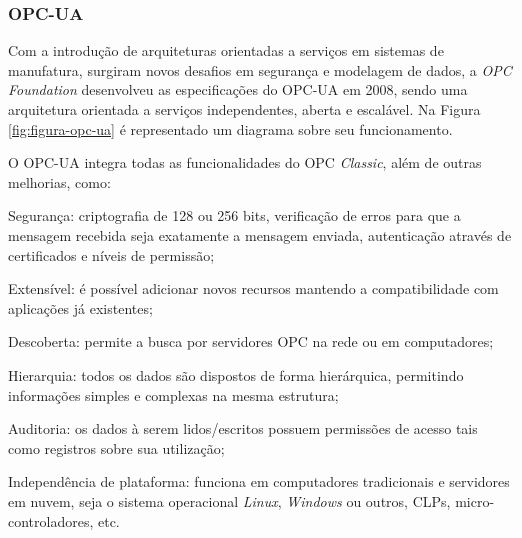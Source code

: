     \subsubsection{OPC-UA}
    \label{sec:opc-ua}

        Com a introdução de arquiteturas orientadas a serviços em sistemas de manufatura, surgiram novos desafios em segurança e modelagem de dados, a \textit{OPC Foundation} desenvolveu as especificações do \gls{OPC-UA} em 2008, sendo uma arquitetura orientada a serviços independentes, aberta e escalável. Na Figura \ref{fig:figura-opc-ua} é representado um diagrama sobre seu funcionamento.
        
	    \begin{figure}[!h]
	    \end{figure}
        
        O \gls{OPC-UA} integra todas as funcionalidades do \gls{OPC} \textit{Classic}, além de outras melhorias, como:
        
        \begin{alineascomponto}
        	\item Segurança: criptografia de 128 ou 256 bits, verificação de erros para que a mensagem recebida seja exatamente a mensagem enviada, autenticação através de certificados e níveis de permissão;
        	\item Extensível: é possível adicionar novos recursos mantendo a compatibilidade com aplicações já existentes;
        	\item Descoberta: permite a busca por servidores \gls{OPC} na rede ou em computadores;
        	\item Hierarquia: todos os dados são dispostos de forma hierárquica, permitindo informações simples e complexas na mesma estrutura;
        	\item Auditoria: os dados à serem lidos/escritos possuem permissões de acesso tais como registros sobre sua utilização;
        	\item Independência de plataforma: funciona em computadores tradicionais e servidores em nuvem, seja o sistema operacional \textit{Linux}, \textit{Windows} ou outros, \glspl{CLP}, micro-controladores, etc.
        	
        \end{alineascomponto}
	    
